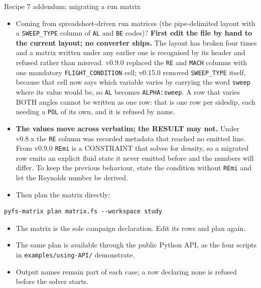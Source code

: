 \documentclass[aspectratio=169,10pt]{beamer}
\newcommand{\code}[1]{\texttt{\small #1}}
\begin{document}
\begin{frame}{Recipe 7 addendum: migrating a run matrix}
  \begin{itemize}
    \item Coming from spreadsheet-driven run matrices (the pipe-delimited layout with a \code{SWEEP\_TYPE} column of \code{AL} and \code{BE} codes)? \textbf{First edit the file by hand to the current layout; no converter ships.} The layout has broken four times and a matrix written under any earlier one is recognised by its header and refused rather than misread. v0.9.0 replaced the \code{RE} and \code{MACH} columns with one mandatory \code{FLIGHT\_CONDITION} cell; v0.15.0 removed \code{SWEEP\_TYPE} itself, because that cell now says which variable varies by carrying the word \code{sweep} where its value would be, so \code{AL} becomes \code{ALPHA:sweep}. A row that varies BOTH angles cannot be written as one row: that is one row per sideslip, each needing a \code{POL} of its own, and it is refused by name.
  \end{itemize}
  \begin{itemize}
    \item \textbf{The values move across verbatim; the RESULT may not.} Under v0.8.x the \code{RE} column was recorded metadata that reached no emitted line. From v0.9.0 \code{REmi} is a CONSTRAINT that solves for density, so a migrated row emits an explicit fluid state it never emitted before and the numbers will differ. To keep the previous behaviour, state the condition without \code{REmi} and let the Reynolds number be derived.
    \item Then plan the matrix directly:
  \end{itemize}
\begin{lstlisting}
pyfs-matrix plan matrix.fs --workspace study
\end{lstlisting}
  \begin{itemize}
    \item The matrix is the sole campaign declaration. Edit its rows and plan again.
    \item The same plan is available through the public Python API, as the four scripts in \code{examples/using-API/} demonstrate.
    \item Output names remain part of each case; a row declaring none is refused before the solver starts.
  \end{itemize}
\end{frame}
\end{document}

